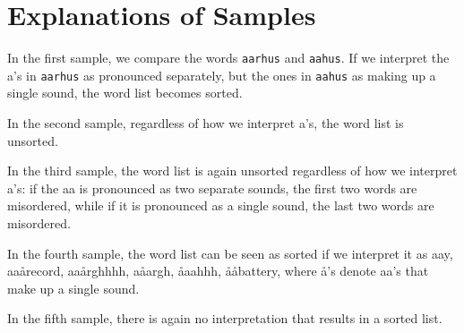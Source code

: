 \section*{Explanations of Samples}
In the first sample, we compare the words \texttt{aarhus} and \texttt{aahus}.
If we interpret the a's in \texttt{aarhus} as pronounced separately, but the ones in \texttt{aahus} as making up a single sound, the word list becomes sorted.

In the second sample, regardless of how we interpret a's, the word list is unsorted.

In the third sample, the word list is again unsorted regardless of how we interpret a's:
if the aa is pronounced as two separate sounds, the first two words are misordered, while if it is pronounced as a single sound, the last two words are misordered.

In the fourth sample, the word list can be seen as sorted if we interpret it as aay, aaårecord, aaårghhhh, aåargh, åaahhh, ååbattery, where å's denote aa's that make up a single sound.

In the fifth sample, there is again no interpretation that results in a sorted list.
